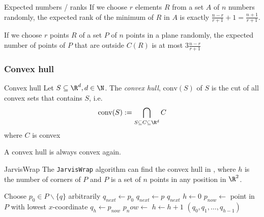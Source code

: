 \begin{corollary}[]{Expected numbers / ranks}
    If we choose $r$ elements $R$ from a set $A$ of $n$ numbers randomly, the expected rank of the minimum of $R$ in $A$ is exactly $\frac{n - r}{r + 1} + 1 = \frac{n + 1}{r + 1}$.

    If we choose $r$ points $R$ of a set $P$ of $n$ points in a plane randomly, the expected number of points of $P$ that are outside $C(R)$ is at most $3 \frac{n - r}{r + 1}$
\end{corollary}


\newpage
\subsubsection{Convex hull}
\begin{definition}[]{Convex hull}
    Let $S \subseteq \R^d, d \in \N$. The \textit{convex hull}, $\text{conv}(S)$ of $S$ is the cut of all convex sets that contains $S$, i.e.
    \begin{align*}
        \text{conv}(S) := \bigcap_{S\subseteq C \subseteq \R^d} C
    \end{align*}
    where $C$ is convex
\end{definition}
A convex hull is always convex again.


\setcounter{all}{37}
\begin{theorem}[]{JarvisWrap}
    The \verb|JarvisWrap| algorithm can find the convex hull in , where $h$ is the number of corners of $P$ and $P$ is a set of $n$ points in any position in $\R^2$.
\end{theorem}


\begin{algorithm}
    \caption{JarvisWrap}
    \begin{algorithmic}[1]
            \State Choose $p_0 \in P\backslash\{q\}$ arbitrarily
            \State $q_{next} \gets p_0$
                    $q_{next} \gets p$ 
                \EndIf
            \EndFor
            \State \Return $q_{next}$
        \EndProcedure
            \State $h \gets 0$
            \State $p_{now} \gets$ point in $P$ with lowest $x$-coordinate
                \State $q_h \gets p_{now}$
                \State $p_now \gets$ 
                \State $h \gets h + 1$
            \EndWhile
            \State \Return $(q_0, q_1, \ldots, q_{h - 1})$
        \EndProcedure
    \end{algorithmic}
\end{algorithm}


